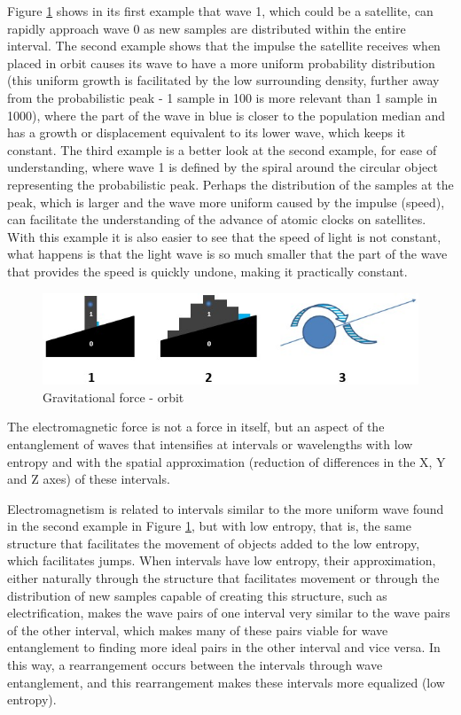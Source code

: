 Figure \ref{fig:consciousness_gravitational_orbit} shows in its first example that wave 1, which could be a satellite, can rapidly approach wave 0 as new samples are distributed within the entire interval. The second example shows that the impulse the satellite receives when placed in orbit causes its wave to have a more uniform probability distribution (this uniform growth is facilitated by the low surrounding density, further away from the probabilistic peak - 1 sample in 100 is more relevant than 1 sample in 1000), where the part of the wave in blue is closer to the population median and has a growth or displacement equivalent to its lower wave, which keeps it constant. The third example is a better look at the second example, for ease of understanding, where wave 1 is defined by the spiral around the circular object representing the probabilistic peak. Perhaps the distribution of the samples at the peak, which is larger and the wave more uniform caused by the impulse (speed), can facilitate the understanding of the advance of atomic clocks on satellites. With this example it is also easier to see that the speed of light is not constant, what happens is that the light wave is so much smaller that the part of the wave that provides the speed is quickly undone, making it practically constant.
	\begin{figure}[H]
	\caption{Gravitational force - orbit}
	\label{fig:consciousness_gravitational_orbit}
	\centering
	\includegraphics[scale=.8]{sections/images/consciousness_gravitational_orbit.jpg}
	\end{figure}

The electromagnetic force is not a force in itself, but an aspect of the entanglement of waves that intensifies at intervals or wavelengths with low entropy and with the spatial approximation (reduction of differences in the X, Y and Z axes) of these intervals.

Electromagnetism is related to intervals similar to the more uniform wave found in the second example in Figure \ref{fig:consciousness_gravitational_orbit}, but with low entropy, that is, the same structure that facilitates the movement of objects added to the low entropy, which facilitates jumps. When intervals have low entropy, their approximation, either naturally through the structure that facilitates movement or through the distribution of new samples capable of creating this structure, such as electrification, makes the wave pairs of one interval very similar to the wave pairs of the other interval, which makes many of these pairs viable for wave entanglement to finding more ideal pairs in the other interval and vice versa. In this way, a rearrangement occurs between the intervals through wave entanglement, and this rearrangement makes these intervals more equalized (low entropy).

